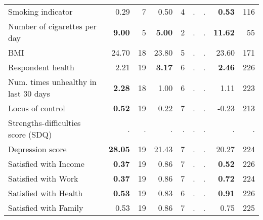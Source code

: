 \begin{tabular}{l r r r r r r r r}
Smoking indicator &      0.29 &         7 &      0.50 &         4 &         . & . & \textbf{     0.53} &       116 \\
Number of cigarettes per day & \textbf{     9.00} &         5 & \textbf{     5.00} &         2 &         . & . & \textbf{    11.62} &        55 \\
BMI &     24.70 &        18 &     23.80 &         5 &         . & . &     23.60 &       171 \\
Respondent health &      2.21 &        19 & \textbf{     3.17} &         6 &         . & . & \textbf{     2.46} &       226 \\
Num. times unhealthy in last 30 days & \textbf{     2.28} &        18 &      1.00 &         6 &         . & . &      1.11 &       223 \\
Locus of control & \textbf{     0.52} &        19 &      0.22 &         7 &         . & . &     -0.23 &       213 \\
Strengths-difficulties score (SDQ) &         . & . &         . & . &         . & . &         . & . \\
Depression score & \textbf{    28.05} &        19 &     21.43 &         7 &         . & . &     20.27 &       224 \\
Satisfied with Income & \textbf{     0.37} &        19 &      0.86 &         7 &         . & . & \textbf{     0.52} &       226 \\
Satisfied with Work & \textbf{     0.37} &        19 &      0.86 &         7 &         . & . & \textbf{     0.72} &       224 \\
Satisfied with Health & \textbf{     0.53} &        19 &      0.83 &         6 &         . & . & \textbf{     0.91} &       226 \\
Satisfied with Family &      0.53 &        19 &      0.86 &         7 &         . & . &      0.75 &       225 \\
\bottomrule
\end{tabular}
